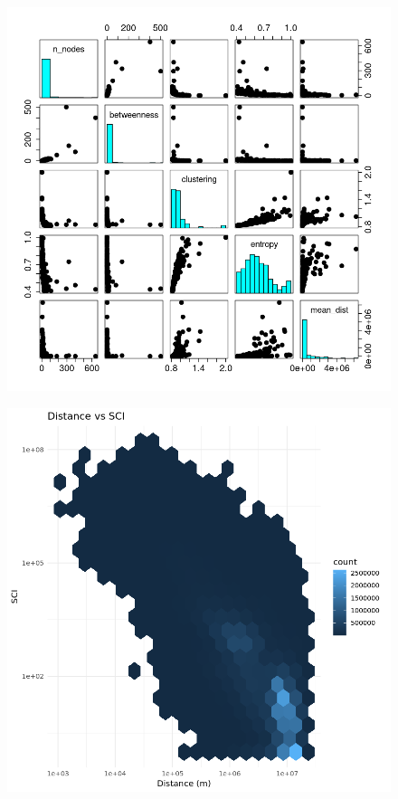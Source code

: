 \begin{figure}[h]
    \centering
    \begin{minipage}{0.5\textwidth}
        \centering
        \includegraphics[width=\textwidth]{images/task44/dataNetworkComparison2.png}
        \label{fig:SCIcomparison}
    \end{minipage}\hfill
    \begin{minipage}{0.5\textwidth}
        \centering
        \includegraphics[width=\textwidth]{images/task44/dataDistanceSCI.png}

\end{minipage}
\end{figure}
